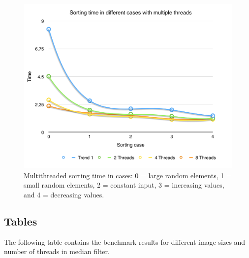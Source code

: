 \documentclass[a4paper,10pt]{article}
\begin{document}
\begin{figure}[H]
\centering
\includegraphics[width=1\textwidth]{figures/w3_SortingTime}
\caption{Multithreaded sorting time in cases:  0 = large random elements, 1 = small random elements, 2 = constant input, 3 = increasing values, and 4 = decreasing values.}
\label{fig:pca_type}
\end{figure}

\subsection{Tables}

The following table contains the benchmark results for different image sizes and number of threads in median filter. 
\end{document}
